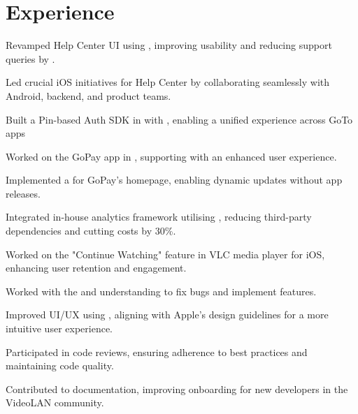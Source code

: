 \documentclass{fonts}
\begin{document}
%
%


\section{Experience}
\textbf{\href{https://www.gojek.io/}{}} 
\begin{tightemize}
    \item Revamped Help Center UI using , improving usability and reducing support queries by .
    \item Led crucial iOS initiatives for Help Center by collaborating seamlessly with Android, backend, and product teams.
    \item Built a Pin-based Auth SDK in  with , enabling a unified experience across GoTo apps
    \item Worked on the GoPay app in , supporting  with an enhanced user experience.
    \item Implemented a  for GoPay's homepage, enabling dynamic updates without app releases.
    \item Integrated in-house analytics framework utilising , reducing third-party dependencies and cutting costs by 30\%.
\end{tightemize}
\sectionsep

\textbf{\href{https://summerofcode.withgoogle.com/projects/6623823417311232}{}} 
\begin{tightemize}
    \item Worked on the "Continue Watching" feature in VLC media player for iOS, enhancing user retention and engagement.
    \item Worked with the  and understanding  to fix bugs and implement features.
    \item Improved UI/UX using , aligning with Apple's design guidelines for a more intuitive user experience.
    \item Participated in code reviews, ensuring adherence to best practices and maintaining code quality.
    \item Contributed to documentation, improving onboarding for new developers in the VideoLAN community.
\end{tightemize}
\sectionsep
\end{document}
